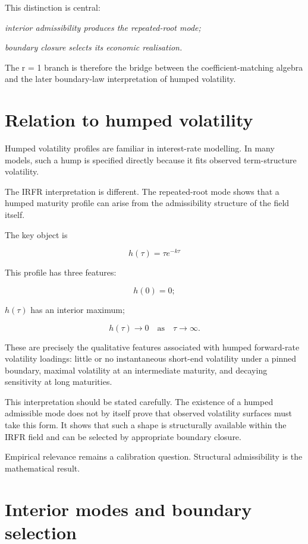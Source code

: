 \documentclass[11pt,oneside]{book}
\begin{document}
This distinction is central:

\begin{center}\emph{interior admissibility produces the repeated-root mode;}\end{center}
\begin{center}\emph{boundary closure selects its economic realisation.}\end{center}
The r = 1 branch is therefore the bridge between the
coefficient-matching algebra and the later boundary-law interpretation
of humped volatility.

\section{Relation to humped volatility}

Humped volatility profiles are familiar in interest-rate modelling. In
many models, such a hump is specified directly because it fits observed
term-structure volatility.

The IRFR interpretation is different. The repeated-root mode shows that
a humped maturity profile can arise from the admissibility structure of
the field itself.

The key object is

\[
h(\tau) = \tau e^{-k\tau}
\]

This profile has three features:

\[
h(0) = 0;
\]

\begin{center}\(h(\tau)\) has an interior maximum;\end{center}

\[
h(\tau) \to 0 \quad \text{as} \quad \tau \to \infty.
\]

These are precisely the qualitative features associated with humped
forward-rate volatility loadings: little or no instantaneous short-end
volatility under a pinned boundary, maximal volatility at an
intermediate maturity, and decaying sensitivity at long maturities.

This interpretation should be stated carefully. The existence of a
humped admissible mode does not by itself prove that observed volatility
surfaces must take this form. It shows that such a shape is structurally
available within the IRFR field and can be selected by appropriate
boundary closure.

Empirical relevance remains a calibration question. Structural
admissibility is the mathematical result.

\section{Interior modes and boundary selection}
\end{document}
